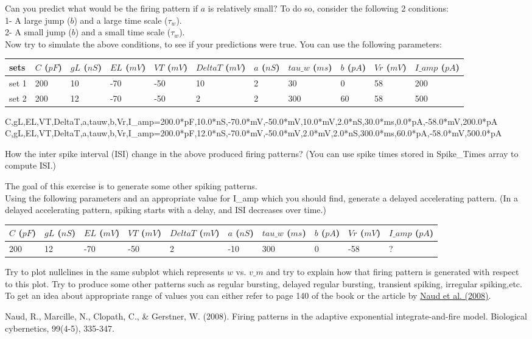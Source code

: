 \documentclass[a4paper,10pt]{Exercises}
\begin{document}
\Exercise[]
Can you predict what would be the firing pattern if $a$ is relatively small?
To do so, consider the following 2 conditions:\\
1- A large jump ($b$) and a large time scale ($\tau_w$).\\
2- A small jump ($b$) and a small time scale ($\tau_w$).\\
Now try to simulate the above conditions, to see if your predictions were true.
You can use the following parameters:
\begin{table}[h]
\small
\label{table1}
\begin{tabular}{|l|l|l|l|l|l|l|l|l|l|l|}
\hline
 sets &$C$ ($pF$) & $gL$ ($nS$) & $EL$ ($mV$)  & $VT$ ($mV$) & $DeltaT$ ($mV$) & $a$ ($nS$) & $tau\_w$ ($ms$) & $b$ ($pA$) & $Vr$ ($mV$) & $I\_amp$ ($pA$)  \\ \hline
 set 1 & 200 & 10 & -70 & -50 & 10 & 2 & 30 & 0 & 58 & 200   \\ \hline
 set 2 & 200 & 12 & -70 & -50 & 2 & 2 & 300 & 60 & 58 & 500   \\ \hline
\end{tabular}
\end{table}

C,gL,EL,VT,DeltaT,a,tauw,b,Vr,I\_amp=200.0*pF,10.0*nS,-70.0*mV,-50.0*mV,10.0*mV,2.0*nS,30.0*ms,0.0*pA,-58.0*mV,200.0*pA\\
C,gL,EL,VT,DeltaT,a,tauw,b,Vr,I\_amp=200.0*pF,12.0*nS,-70.0*mV,-50.0*mV,2.0*mV,2.0*nS,300.0*ms,60.0*pA,-58.0*mV,500.0*pA

\Question How the inter spike interval (ISI) change in the above produced firing patterns? (You can use spike times stored in Spike_Times array to compute ISI.) 

\Exercise[]

The goal of this exercise is to generate some other spiking patterns.\\
\Question Using the following parameters and an appropriate value for I\_amp which you should find, generate a delayed accelerating pattern. (In a delayed accelerating pattern, spiking starts with a delay, and ISI decreases over time.)\\
\begin{table}[h]
\centering
\label{table2}
\begin{tabular}{|l|l|l|l|l|l|l|l|l|l|}
\hline
\small
$C$ ($pF$) & $gL$ ($nS$) & $EL$ ($mV$)  & $VT$ ($mV$) & $DeltaT$ ($mV$) & $a$ ($nS$) & $tau\_w$ ($ms$) & $b$ ($pA$) & $Vr$ ($mV$) & $I\_amp$ ($pA$)  \\ \hline
  200 & 12 & -70 & -50 & 2 & -10 & 300 & 0 & -58 & ? \\ \hline
\end{tabular}
\end{table}
\Question Try to plot nullclines in the same subplot which represents $w$ vs. $v\_m$ and try to explain how that firing pattern is generated with respect to this plot.
\Question Try to produce some other patterns such as regular bursting, delayed regular bursting, transient spiking, irregular spiking,etc.\\
To get an idea about appropriate range of values you can either refer to page 140 of the book or the article by \href{http://link.springer.com/article/10.1007/s00422-008-0264-7}{Naud et al. (2008)}.

\References
Naud, R., Marcille, N., Clopath, C., & Gerstner, W. (2008). Firing patterns in the adaptive exponential integrate-and-fire model. Biological cybernetics, 99(4-5), 335-347.




\end{document}
